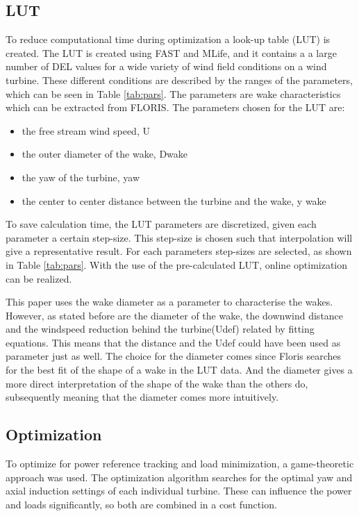 \subsection{LUT}
 To reduce computational time during optimization a look-up table (LUT) is created. The LUT is created using FAST and MLife, and it contains a a large number of DEL values for a wide variety of wind field conditions on a wind turbine.
These different conditions are described by the ranges of the parameters, which can be seen in Table \ref{tab:pars}. The parameters are wake characteristics which can be extracted from FLORIS. The parameters chosen for the LUT are:\begin{itemize}
	\item the free stream wind speed, U
	\item the outer diameter of the wake, Dwake
	\item the yaw of the turbine, yaw  
	\item the center to center distance between the turbine and the wake, y wake 
\end{itemize}   
 To save calculation time, the LUT parameters are discretized, given each parameter a certain step-size. This step-size is chosen such that interpolation will give a representative result. For each parameters step-sizes are selected, as shown in Table \ref{tab:pars}. With the use of the pre-calculated LUT, online optimization can be realized.



 This paper uses the wake diameter as a parameter to characterise the wakes. However, as stated before are the diameter of the wake, the downwind distance and the windspeed reduction behind the turbine(Udef) related by fitting equations. This means that the distance and the Udef could have been used as parameter just as well. The choice for the diameter comes since Floris searches for the best fit of the shape of a wake in the LUT data. And the diameter gives a more direct interpretation of the shape of the wake than the others do, subsequently meaning that the diameter comes more intuitively.

 
 

\subsection{Optimization}
To optimize for power reference tracking and load minimization, a game-theoretic approach was used.\cite{Marden2013} The optimization algorithm searches for the optimal yaw and axial induction settings of each individual turbine. These can influence the power and loads significantly, so both are combined in a cost function. \cite{Marden2013}\cite{Dijk2016} 


